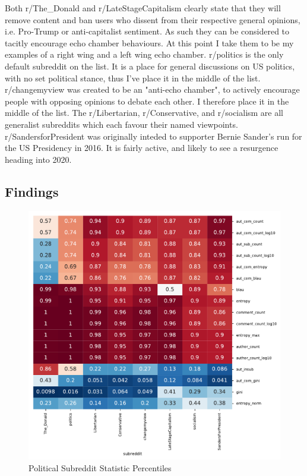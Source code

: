 Both r/The\_Donald and r/LateStageCapitalism clearly state that they will remove content and ban users who dissent from their respective general opinions, i.e. Pro-Trump or anti-capitalist sentiment. As such they can be considered to tacitly encourage echo chamber behaviours. At this point I take them to be my examples of a right wing and a left wing echo chamber. r/politics is the only default subreddit on the list. It is a place for general discussions on US politics, with no set political stance, thus I've place it in the middle of the list. r/changemyview was created to be an "anti-echo chamber", to actively encourage people with opposing opinions to debate each other. I therefore place it in the middle of the list. The r/Libertarian, r/Conservative, and r/socialism are all generalist subreddits which each favour their named viewpoints. r/SandersforPresident was originally inteded to supporter Bernie Sander's run for the US Presidency in 2016. It is fairly active, and likely to see a resurgence heading into 2020.

\subsection{Findings}

\begin{figure}
    \centering
    \includegraphics[scale=0.8]{latex/matrix/pol-cluster-active.pdf}
    \caption{Political Subreddit Statistic Percentiles}
    \label{pol-heatmap}
\end{figure}



